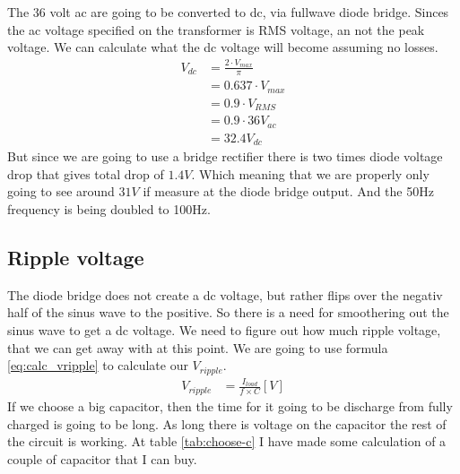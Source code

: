 The 36 volt ac are going to be converted to dc, via fullwave diode bridge. Sinces the ac voltage specified on the transformer is RMS voltage, an not the peak voltage. We can calculate what the dc voltage will become assuming no losses.
\begin{align} \label{eq:calc_vdc}
V_{ dc } &= \frac{ 2 \cdot V_{ max } }{ \pi } \\
         &= 0.637 \cdot V_{ max } \\
         &= 0.9 \cdot V_{ RMS } \\
         &= 0.9 \cdot 36 V_{ac} \nonumber \\
         &= 32.4 V_{ dc } \nonumber
\end{align}
But since we are going to use a bridge rectifier there is two times diode voltage drop that gives total drop of \(1.4V\). Which meaning that we are properly only going to see around \( 31V \) if measure at the diode bridge output. And the 50Hz frequency is being doubled to 100Hz.

\subsection{Ripple voltage}
The diode bridge does not create a dc voltage, but rather flips over the negativ half of the sinus wave to the positive. So there is a need for smoothering out the sinus wave to get a dc voltage. 
We need to figure out how much ripple voltage, that we can get away with at this point. We are going to use formula \ref{eq:calc_vripple} to calculate our $V_{ripple}$.
\begin{align}\label{eq:calc_vripple}
V_{ ripple } &= \frac{ I_{ load } }{ f \times C } [V]
\end{align}
If we choose a big capacitor, then the time for it going to be discharge from fully charged is going to be long. As long there is voltage on the capacitor the rest of the circuit is working. At table \ref{tab:choose-c} I have made some calculation of a couple of capacitor that I can buy.

